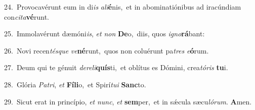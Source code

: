 {\numbfont\textcolor{\numbcolor}{24.}}~Provocavérunt eum in di\textit{is} \textit{a}\-\textit{li}\textbf{é}nis,~\star et in abominatiónibus ad iracúndiam con\-\textit{ci}\-\textit{ta}\textbf{vé}runt.\par
{\numbfont\textcolor{\numbcolor}{25.}}~Immolavérunt dæmóni\-\textit{is}\-, \textit{et} \textit{non} \textbf{De}\-o,~\star diis, quos \textit{i}\-\textit{gno}\textbf{rá}bant:\par
{\numbfont\textcolor{\numbcolor}{26.}}~Novi recen\-\textit{tés}\-\textit{que} \textit{ve}\-\textbf{né}runt,~\star quos non coluérunt pa\textit{tres} \textit{e}\-\textbf{ó}rum.\par
{\numbfont\textcolor{\numbcolor}{27.}}~Deum qui te génuit \textit{de}\-\textit{re}\textit{li}\textbf{quís}ti,~\star et oblítus es Dómini, crea\-\textit{tó}\-\textit{ris} \textbf{tu}\-i.\par
{\numbfont\textcolor{\numbcolor}{28.}}~Glória \textit{Pa}\-\textit{tri}, \textit{et} \textbf{Fí}\-\textbf{li}o,~\star et Spirí\-\textit{tu}\-\textit{i} \textbf{Sanc}\-to.\par
{\numbfont\textcolor{\numbcolor}{29.}}~Sicut erat in princípio, \textit{et} \textit{nunc}\-, \textit{et} \textbf{sem}\-per,~\star et in sǽcula sæcu\-\textit{ló}\-\textit{rum}. \textbf{A}\-men.\par
